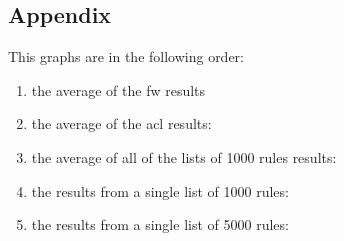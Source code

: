 \documentclass[11pt,letterpaper]{article}
\begin{document}
\begin{widetext}
\section{Appendix}
This graphs are in the following order: 
\begin{enumerate}
\item the average of the fw results
\item the average of the acl results:
\item the average of all of the lists of 1000 rules results:
\item the results from a single list of 1000 rules:
\item the results from a single list of 5000 rules:
\end{enumerate}
{}
\clearpage
{}

\end{widetext}
\end{document}
